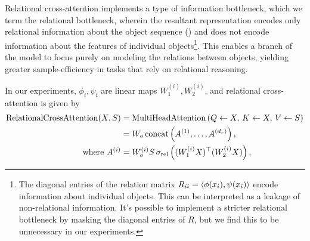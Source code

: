 Relational cross-attention implements a type of information bottleneck, which we term the relational bottleneck, wherein the resultant representation encodes only relational information about the object sequence () and does not encode information about the features of individual objects\footnote{The diagonal entries of the relation matrix $R_{ii} = \left \langle \phi(x_i), \psi(x_i) \right\rangle$ encode information about individual objects. This can be interpreted as a leakage of non-relational information. It's possible to implement a stricter relational bottleneck by masking the diagonal entries of $R$, but we find this to be unnecessary in our experiments.}. This enables a branch of the model to focus purely on modeling the relations between objects, yielding greater sample-efficiency in tasks that rely on relational reasoning.


In our experiments, $\phi_i, \psi_i$ are linear maps $W_1^{(i)}, W_2^{(i)}$, and relational cross-attention is given by
\begin{equation}
    \begin{split}
        \mathrm{RelationalCrossAttention}(X, S) &= \mathrm{MultiHeadAttention}\left(Q \gets X,\, K \gets X,\, V \gets S\right) \\
        &= W_o \, \mathrm{concat}\left(A^{(1)}, \ldots, A^{(d_r)}\right), \\
        \text{where } A^{(i)} &= W_o^{(i)} S \, \sigma_{\mathrm{rel}}\left((W_1^{(i)} X)^\top (W_2^{(i)} X)\right).
    \end{split}
\end{equation}

